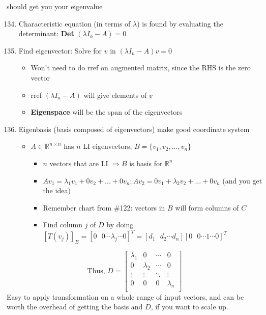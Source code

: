 \documentclass[10pt,letterpaper]{article}
\begin{document}
\hspace{1.2cm} \textbullet{}  should get you your eigenvalue
\begin{enumerate}
\setcounter{enumi}{133}
\item  Characteristic equation (in terms of $\lambda$) is found by evaluating the determinant: \textbf{Det} $(\lambda I_k - A)= 0$
\item Find eigenvector: Solve for $v$ in $(\lambda I_n - A) v = 0$

\begin{itemize}
\item Won't need to do rref on augmented matrix, since the RHS is the zero vector
\item rref $(\lambda I_n - A)$ will give elements of $v$
\item \textbf{Eigenspace} will be the span of the eigenvectors
\end{itemize}

\setcounter{enumi}{137}
\item  Eigenbasis (basis composed of eigenvectors) make good coordinate system

\begin{itemize}
\item $A \in \mathbb{R}^{n \times n}$ has $n$ LI eigenvectors, $B=\{v_1, v_2, ..., v_n\}$

\begin{itemize}
\item $n$ vectors that are LI $\Rightarrow B$ is basis for $\mathbb{R}^{n}$
\item $Av_1 = \lambda_1 v_1 + 0 v_2 + ... + 0 v_n; Av_2 = 0 v _{1} + \lambda_2 v_2 + ... + 0 v_n$ (and you get the idea)
\item Remember chart from \#122: vectors in $B$ will form columns of $C$
\item Find column $j$ of $D$ by doing $[T(v_j)]_B = [0 \text{ } 0 \cdots \lambda_j \cdots 0 ]^T = [d_1 \text{ } d_2 \cdots d_n] [0 \text{ } 0 \cdots 1 \cdots 0] ^{T}$
\end{itemize}

\end{itemize}

\end{enumerate}
\[
\text{Thus, }D=
\begin{bmatrix}
  \lambda_1 &         0 & \cdots &         0 \\
          0 & \lambda_2 & \cdots &         0 \\
     \vdots &    \vdots & \ddots &    \vdots \\
          0 &         0 & 0      & \lambda_n \\
\end{bmatrix}
\]
Easy to apply transformation on a whole range of input vectors, and can be worth the overhead of getting the basis and $D$, if you want to scale up.
\end{document}
